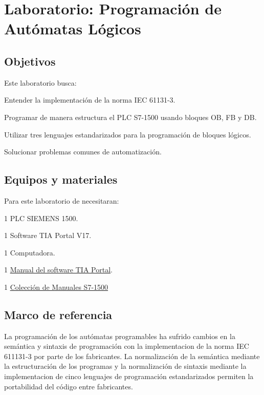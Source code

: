 
\chapter{Laboratorio:  Programación de Autómatas Lógicos}


\section{Objetivos}
Este  laboratorio busca:
\begin{itemize}
	{\small
    \item Entender la implementación de la norma IEC 61131-3.
    \item Programar  de manera estructura el PLC S7-1500 usando bloques OB, FB y DB.
    \item Utilizar tres lenguajes estandarizados para la programación de bloques lógicos.
    \item Solucionar problemas comunes de automatización.
 }
\end{itemize} 

 
\section{Equipos y materiales}
Para este laboratorio de necesitaran:
\begin{itemize}
	{\small 
	\item 1 PLC SIEMENS 1500.
	\item 1 Software TIA Portal V17.
	\item 1 Computadora.
	\item 1 \href{https://support.industry.siemens.com/dl/files/056/109815056/att_1121729/v4/STEP_7_WinCC_V18_esES_es-ES.pdf}{Manual del software TIA Portal}.
	\item 1 \href{https://cache.industry.siemens.com/dl/files/384/86140384/att_1131259/v1/s71500_et200mp_manual_collection_es-ES.pdf}{Colección de Manuales S7-1500}
}
\end{itemize}

\section{Marco de referencia}

La programación de los autómatas programables ha sufrido cambios en la semántica y sintaxis de programación con la implementacion de la norma IEC 611131-3 \cite{IEC61131-1} por parte de los fabricantes. La normalización de la semántica  mediante la estructuración de los programas y la normalización de sintaxis mediante la implementacion de cinco lenguajes de programación estandarizados  permiten la portabilidad del código entre fabricantes. 

